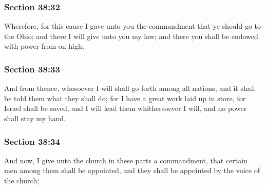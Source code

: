 	\subsubsection{Section 38:32} %
		\label{DC38-32}

		Wherefore, for this cause I gave unto you the commandment that ye should go to the Ohio; and there I will give unto you my law; and there you shall be endowed with power from on high;


	\subsubsection{Section 38:33} %
		\label{DC38-33}

		And from thence, whosoever I will shall go forth among all nations, and it shall be told them what they shall do; for I have a great work laid up in store, for Israel shall be saved, and I will lead them whithersoever I will, and no power shall stay my hand.


	\subsubsection{Section 38:34} %
		\label{DC38-34}

		And now, I give unto the church in these parts a commandment, that certain men among them shall be appointed, and they shall be appointed by the voice of the church;


